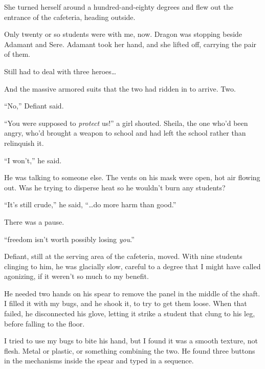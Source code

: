 She turned herself around a hundred-and-eighty degrees and flew out the entrance of the cafeteria, heading outside.



Only twenty or so students were with me, now.  Dragon was stopping beside Adamant and Sere.  Adamant took her hand, and she lifted off, carrying the pair of them.



Still had to deal with three heroes\ldots



And the massive armored suits that the two had ridden in to arrive.  Two.



``No,'' Defiant said.



``You were supposed to \emph{protect} us!'' a girl shouted.  Sheila, the one who'd been angry, who'd brought a weapon to school and had left the school rather than relinquish it.



``I won't,'' he said.



He was talking to someone else.  The vents on his mask were open, hot air flowing out.  Was he trying to disperse heat so he wouldn't burn any students?



``It's still crude,'' he said, ``\ldots do more harm than good.''



There was a pause.



``\ldotsr freedom isn't worth possibly losing \emph{you}.''



Defiant, still at the serving area of the cafeteria, moved.  With nine students clinging to him, he was glacially slow, careful to a degree that I might have called agonizing, if it weren't so much to my benefit.



He needed two hands on his spear to remove the panel in the middle of the shaft.  I filled it with my bugs, and he shook it, to try to get them loose.  When that failed, he disconnected his glove, letting it strike a student that clung to his leg, before falling to the floor.



I tried to use my bugs to bite his hand, but I found it was a smooth texture, not flesh.  Metal or plastic, or something combining the two.  He found three buttons in the mechanisms inside the spear and typed in a sequence.



